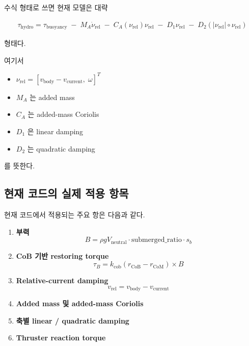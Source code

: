 \documentclass[11pt,a4paper]{article}
\begin{document}
수식 형태로 쓰면 현재 모델은 대략

\begin{align}
\tau_{\text{hydro}}
=
\tau_{\text{buoyancy}}
\;-\;
M_A \dot{\nu}_{\text{rel}}
\;-\;
C_A(\nu_{\text{rel}})\nu_{\text{rel}}
\;-\;
D_1 \nu_{\text{rel}}
\;-\;
D_2 \left(|\nu_{\text{rel}}| \circ \nu_{\text{rel}}\right)
\end{align}

형태다.

여기서

\begin{itemize}[leftmargin=2em]
  \item $\nu_{\text{rel}} = [v_{\text{body}} - v_{\text{current}},\; \omega]^T$
  \item $M_A$ 는 added mass
  \item $C_A$ 는 added-mass Coriolis
  \item $D_1$ 은 linear damping
  \item $D_2$ 는 quadratic damping
\end{itemize}

를 뜻한다.

\subsection{현재 코드의 실제 적용 항목}

현재 코드에서 적용되는 주요 항은 다음과 같다.

\begin{enumerate}[leftmargin=2em]
  \item \textbf{부력}
  \begin{equation}
  B = \rho g V_{\text{neutral}} \cdot \text{submerged\_ratio} \cdot s_b
  \end{equation}

  \item \textbf{CoB 기반 restoring torque}
  \begin{equation}
  \tau_B = k_{\text{cob}} (r_{\text{CoB}} - r_{\text{CoM}})\times B
  \end{equation}

  \item \textbf{Relative-current damping}
  \begin{equation}
  v_{\text{rel}} = v_{\text{body}} - v_{\text{current}}
  \end{equation}

  \item \textbf{Added mass 및 added-mass Coriolis}

  \item \textbf{축별 linear / quadratic damping}

  \item \textbf{Thruster reaction torque}
\end{enumerate}
\end{document}

